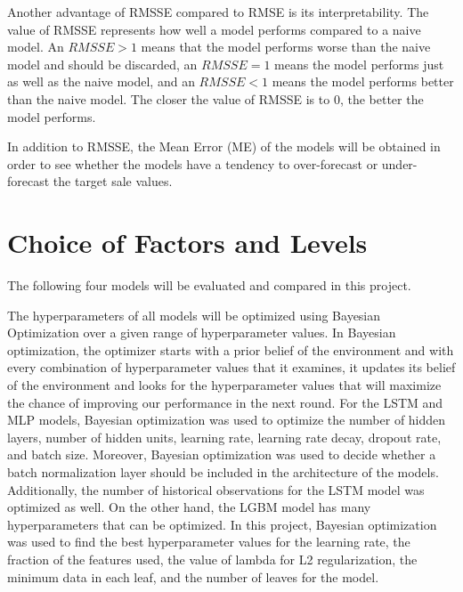 Another advantage of RMSSE compared to RMSE is its interpretability. 
The value of RMSSE represents how well a model performs compared to a naive model. 
An \(RMSSE > 1\) means that the model performs worse than the naive model and should be discarded, an \(RMSSE = 1\) means the model performs just as well as the naive model, and an \(RMSSE < 1\) means the model performs better than the naive model. 
The closer the value of RMSSE is to 0, the better the model performs.

In addition to RMSSE, the Mean Error (ME) of the models will be obtained in order to see whether the models have a tendency to over-forecast or under-forecast the target sale values.

\section{Choice of Factors and Levels}
The following four models will be evaluated and compared in this project.

\begin{enumerate}
\end{enumerate}

The hyperparameters of all models will be optimized using Bayesian Optimization over a given range of hyperparameter values.
In Bayesian optimization, the optimizer starts with a prior belief of the environment and with every combination of hyperparameter values that it examines, it updates its belief of the environment and looks for the hyperparameter values that will maximize the chance of improving our performance in the next round. 
For the LSTM and MLP models, Bayesian optimization was used to optimize the number of hidden layers, number of hidden units, learning rate, learning rate decay, dropout rate, and batch size.
Moreover, Bayesian optimization was used to decide whether a batch normalization layer should be included in the architecture of the models. 
Additionally, the number of historical observations for the LSTM model was optimized as well.
On the other hand, the LGBM model has many hyperparameters that can be optimized. 
In this project, Bayesian optimization was used to find the best hyperparameter values for the learning rate, the fraction of the features used, the value of lambda for L2 regularization, the minimum data in each leaf, and the number of leaves for the model.

